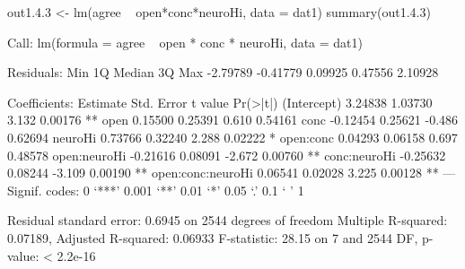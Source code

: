 \begin{Schunk}
\begin{Sinput}
 out1.4.3 <- lm(agree ~ open*conc*neuroHi, data = dat1)
 summary(out1.4.3)
\end{Sinput}
\begin{Soutput}
Call:
lm(formula = agree ~ open * conc * neuroHi, data = dat1)

Residuals:
     Min       1Q   Median       3Q      Max 
-2.79789 -0.41779  0.09925  0.47556  2.10928 

Coefficients:
                  Estimate Std. Error t value Pr(>|t|)   
(Intercept)        3.24838    1.03730   3.132  0.00176 **
open               0.15500    0.25391   0.610  0.54161   
conc              -0.12454    0.25621  -0.486  0.62694   
neuroHi            0.73766    0.32240   2.288  0.02222 * 
open:conc          0.04293    0.06158   0.697  0.48578   
open:neuroHi      -0.21616    0.08091  -2.672  0.00760 **
conc:neuroHi      -0.25632    0.08244  -3.109  0.00190 **
open:conc:neuroHi  0.06541    0.02028   3.225  0.00128 **
---
Signif. codes:  0 ‘***’ 0.001 ‘**’ 0.01 ‘*’ 0.05 ‘.’ 0.1 ‘ ’ 1

Residual standard error: 0.6945 on 2544 degrees of freedom
Multiple R-squared:  0.07189,	Adjusted R-squared:  0.06933 
F-statistic: 28.15 on 7 and 2544 DF,  p-value: < 2.2e-16
\end{Soutput}
\end{Schunk}
